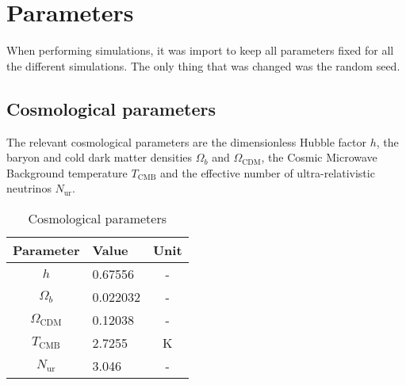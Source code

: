 %
%


\section{Parameters}

When performing simulations, it was import to keep all parameters fixed for all the different simulations. The only thing that was changed was the random seed.

    \subsection{Cosmological parameters}
        The relevant cosmological parameters are the dimensionless Hubble factor $h$, the baryon and cold dark matter densities $\Omega_b$ and $\Omega_\mathrm{CDM}$, the Cosmic Microwave Background temperature $T_\mathrm{CMB}$ and the effective number of ultra-relativistic neutrinos $N_\mathrm{ur}$.

        \begin{table}[h]\label{tab:simulations_cosmological_parameters}
            \centering
            \caption{Cosmological parameters}
            \begin{tabular}{c|l|c}
                \toprule
                \textbf{Parameter} & \textbf{Value} & \textbf{Unit} \\
                \midrule
                $h$ & 0.67556 & -\\
                $\Omega_b$ & 0.022032 & -\\
                $\Omega_\mathrm{CDM}$ & 0.12038 & - \\
                $T_\mathrm{CMB} $ & 2.7255 & K \\
                $N_\mathrm{ur}$ & 3.046 & - \\
                \bottomrule
            \end{tabular}
        \end{table}

